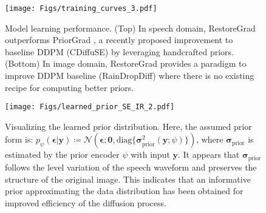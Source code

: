 \begin{figure}[!t]
    \centerline{\texttt{[image: Figs/training\_curves\_3.pdf]}}
    \vspace{-0.3cm}
    \caption{Model learning performance. (Top) In speech domain, RestoreGrad outperforms PriorGrad \citep{lee2021priorgrad}, a recently proposed improvement to baseline DDPM (CDiffuSE) by leveraging handcrafted priors. (Bottom) In image domain, RestoreGrad provides a paradigm to improve DDPM baseline (RainDropDiff) where there is no existing recipe for computing better priors.} 
\label{fig: training_curve}
\end{figure} 

\begin{figure}[!t]  
    \centerline{\texttt{[image: Figs/learned\_prior\_SE\_IR\_2.pdf]}}
    \vspace{-0.3cm}
    \caption{Visualizing the learned prior distribution. Here, the assumed prior form is: $p_\psi(\boldsymbol{\epsilon}|\mathbf{y})\coloneq\mathcal{N}(\boldsymbol{\epsilon}; \mathbf{0},\mbox{diag}\{\boldsymbol{\sigma}^2_{\text{prior}}(\mathbf{y};\psi)\})$, where $\boldsymbol{\sigma}_{\text{prior}}$ is estimated by the prior encoder $\psi$ with input $\mathbf{y}$. It appears that $\boldsymbol{\sigma}_{\text{prior}}$ follows the level variation of the speech waveform and preserves the structure of the original image. This indicates that an informative prior approximating the data distribution has been obtained for improved efficiency of the diffusion process.} 
\label{fig: learned priors}
\end{figure} 
